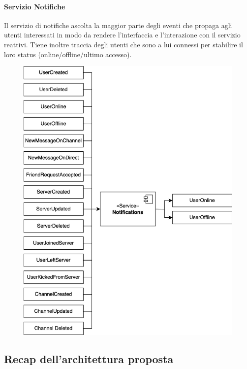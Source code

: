 %
%
%
\paragraph{Servizio Notifiche}

Il servizio di notifiche ascolta la maggior parte degli eventi che propaga agli utenti interessati in modo da rendere l'interfaccia e l'interazione con il servizio reattivi.
Tiene inoltre traccia degli utenti che sono a lui connessi per stabilire il loro status (online/offline/ultimo accesso).

\begin{figure}[H]
    \centering
    \includegraphics[width=\textwidth]{sections/03-design/img/events/piperchat-EventiNotifications.jpg}
    \label{fig:notfications-events}
\end{figure}

%
%
%
\subsection{Recap dell'architettura proposta}

